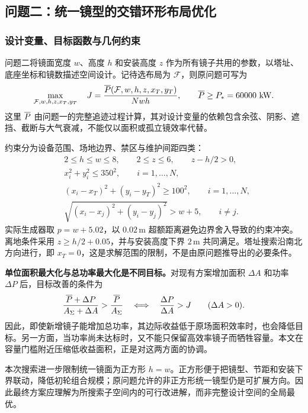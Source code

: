 \subsection{问题二：统一镜型的交错环形布局优化}
\subsubsection{设计变量、目标函数与几何约束}
问题二将镜面宽度 $w$、高度 $h$ 和安装高度 $z$ 作为所有镜子共用的参数，以塔址、底座坐标和镜数描述空间设计。记待选布局为 $\mathcal F$，则原问题可写为
\begin{equation}\label{eq:q2objective}
\max_{\mathcal F,w,h,z,x_T,y_T}\quad J=\frac{\overline{P}(\mathcal F,w,h,z,x_T,y_T)}{Nwh},
\qquad \overline{P}\ge P_*=60000\ \mathrm{kW}.
\end{equation}
这里 $\overline{P}$ 由问题一的完整追迹过程计算，其对设计变量的依赖包含余弦、阴影、遮挡、截断与大气衰减，不能仅以面积或孤立镜效率代替。

约束分为设备范围、场地边界、禁区与维护间距四类：
\begin{align}
&2\le h\le w\le8,\qquad 2\le z\le6,\qquad z-h/2>0,\\
&x_i^2+y_i^2\le350^2,\qquad i=1,\ldots,N,\\
&(x_i-x_T)^2+(y_i-y_T)^2\ge100^2,\qquad i=1,\ldots,N,\\
&\sqrt{(x_i-x_j)^2+(y_i-y_j)^2}>w+5,\qquad i\ne j.
\end{align}
实际生成器取 $p=w+5.02$，以 $0.02\,\mathrm m$ 超额距离避免边界舍入导致的约束冲突。离地条件采用 $z\ge h/2+0.05$，并与安装高度下界 $2\,\mathrm m$ 共同满足。塔址搜索沿南北方向进行，即 $x_T=0$，这是求解范围的限制，不是由原问题推导出的必要条件。

\textbf{单位面积最大化与总功率最大化是不同目标。}对现有方案增加面积 $\Delta A$ 和功率 $\Delta P$ 后，目标改善的条件为
\begin{equation}\label{eq:marginal}
\frac{\overline{P}+\Delta P}{A_\Sigma+\Delta A}>\frac{\overline{P}}{A_\Sigma}
\quad\Longleftrightarrow\quad\frac{\Delta P}{\Delta A}>J\qquad(\Delta A>0).
\end{equation}
因此，即使新增镜子能增加总功率，其边际收益低于原场面积效率时，也会降低目标。另一方面，当功率尚未达标时，又不能只保留高效率镜子而牺牲容量。本文在容量门槛附近压缩低收益面积，正是对这两方面的协调。

本次搜索进一步限制统一镜面为正方形 $h=w$。正方形便于把镜型、节距和安装下界联动，降低初轮组合规模；原问题允许的非正方形统一镜型仍是可扩展方向。因此最终方案应理解为所搜索子空间内的可行改进解，而非完整设计空间的全局最优。

